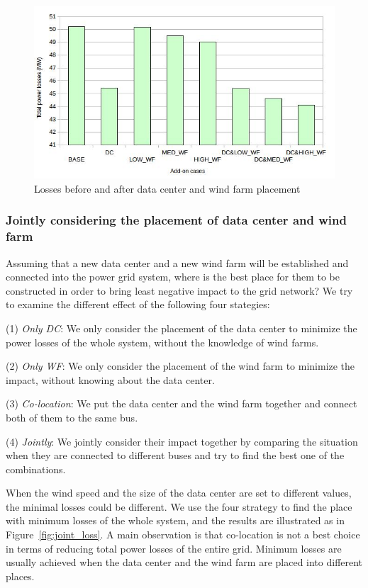 \begin{figure}[ht]
\centering
\includegraphics[width=.8\columnwidth]{img/add-on-cases}
\caption{Losses before and after data center and wind farm placement}
\label{fig:add-on-cases}
\end{figure}

\subsubsection{Jointly considering the placement of data center and wind farm}
Assuming that a new data center and a new wind farm will be established and connected into the power grid system, where is the best place for them to be constructed in order to bring least negative impact to the grid network? We try to examine the different effect of the following four stategies:

(1) \emph{Only DC}: We only consider the placement of the data center to minimize the power losses of the whole system, without the knowledge of wind farms.

(2) \emph{Only WF}: We only consider the placement of the wind farm to minimize the impact, without knowing about the data center.

(3) \emph{Co-location}: We put the data center and the wind farm together and connect both of them to the same bus.

(4) \emph{Jointly}: We jointly consider their impact together by comparing the situation when they are connected to different buses and try to find the best one of the combinations.

When the wind speed and the size of the data center are set to different values, the minimal losses could be different. We use the four strategy to find the place with minimum losses of the whole system, and the results are illustrated as in Figure~\ref{fig:joint_loss}. A main observation is that co-location is not a best choice in terms of reducing total power losses of the entire grid. Minimum losses are usually achieved when the data center and the wind farm are placed into different places.


